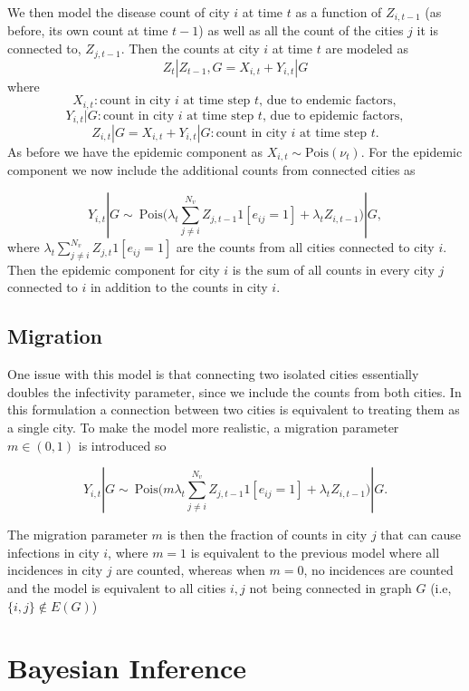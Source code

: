 \documentclass[11pt,a4paper]{article}
\begin{document}
We then model the disease count of city \(i\) at time \(t\) as a
function of \(Z_{i,t-1}\) (as before, its own count at time \(t-1\)) as
well as all the count of the cities \(j\) it is connected to,
\(Z_{j,t-1}\). Then the counts at city \(i\) at time \(t\) are modeled
as \[Z_t|Z_{t-1}, G = X_{i, t} + Y_{i,t}|G\] where
\[X_{i,t}: \text{count in city } i \text{ at time step } t \text{, due to endemic factors}, \]
\[Y_{i,t}|G : \text{count in city } i \text{ at time step } t \text{, due to epidemic factors}, \]
\[Z_{i,t}|G = X_{i,t} + Y_{i,t}|G: \text{count in city } i \text{ at time step } t.\]
As before we have the epidemic component as
\(X_{i,t} \sim\text{Pois}(\nu_t)\). For the epidemic component we now
include the additional counts from connected cities as

\[Y_{i,t}|G \sim ~ \text{Pois}\big(\lambda_t\sum_{j\neq i}^{N_v}Z_{j,t-1}1[e_{ij}=1]+ \lambda_tZ_{i,t-1}\big)|G, \]
where \(\lambda_t\sum_{j\neq i}^{N_v}Z_{j,t}1[e_{ij}=1]\) are the counts
from all cities connected to city \(i\). Then the epidemic component for
city \(i\) is the sum of all counts in every city \(j\) connected to
\(i\) in addition to the counts in city \(i\).

\hypertarget{migration}{%
\subsection{Migration}\label{migration}}

One issue with this model is that connecting two isolated cities
essentially doubles the infectivity parameter, since we include the
counts from both cities. In this formulation a connection between two
cities is equivalent to treating them as a single city. To make the
model more realistic, a migration parameter \(m \in (0,1)\) is
introduced so

\[Y_{i,t}|G \sim ~ \text{Pois}\big(m\lambda_t\sum_{j\neq i}^{N_v}Z_{j,t-1}1[e_{ij}=1]+ \lambda_tZ_{i,t-1}\big)|G.\]

The migration parameter \(m\) is then the fraction of counts in city
\(j\) that can cause infections in city \(i\), where \(m = 1\) is
equivalent to the previous model where all incidences in city \(j\) are
counted, whereas when \(m = 0\), no incidences are counted and the model
is equivalent to all cities \(i,j\) not being connected in graph \(G\)
(i.e, \(\{i,j\} \notin E(G)\))

\hypertarget{bayesian-inference}{%
\section{Bayesian Inference}\label{bayesian-inference}}
\end{document}
